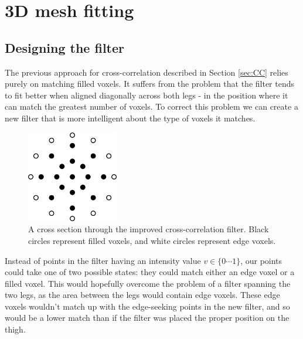 \section{3D mesh fitting}

\subsection{Designing the filter}

The previous approach for cross-correlation described in Section \ref{sec:CC} relies purely on matching filled voxels.
It suffers from the problem that the filter tends to fit better when aligned diagonally across both legs - in the position where it can match the greatest number of voxels.
To correct this problem we can create a new filter that is more intelligent about the type of voxels it matches.

\begin{figure}[b]
	\centering
	\includegraphics[width=4cm]{../interim/improvedfilter.png}
	\caption{A cross section through the improved cross-correlation filter.
		Black circles represent filled voxels, and white circles represent edge voxels.}
	\label{ImprovedFilterCross}
\end{figure}

Instead of points in the filter having an intensity value $v \in \{0 \cdots 1\}$, our points could take one of two possible states: they could match either an edge voxel or a filled voxel.
This would hopefully overcome the problem of a filter spanning the two legs, as the area between the legs would contain edge voxels.
These edge voxels wouldn't match up with the edge-seeking points in the new filter, and so would be a lower match than if the filter was placed the proper position on the thigh.


